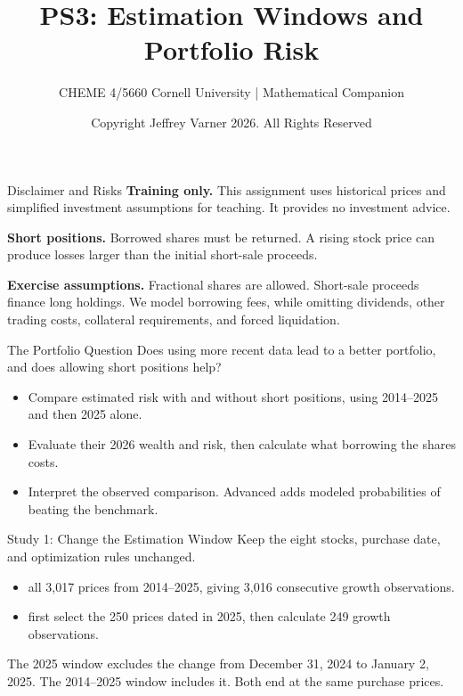 \documentclass[aspectratio=169,11pt]{beamer}
\title{\texorpdfstring{{\vnheavy PS3}}{PS3}: Estimation Windows and Portfolio Risk}
\subtitle{CHEME 4/5660 Cornell University | Mathematical Companion}
\author{Copyright Jeffrey Varner 2026. All Rights Reserved}
\begin{document}
\vntitlepage

\begin{frame}{Disclaimer and Risks}
\textbf{Training only.} This assignment uses historical prices and simplified
investment assumptions for teaching. It provides no investment advice.

\vspace{1em}
\textbf{Short positions.} Borrowed shares must be returned. A rising stock
price can produce losses larger than the initial short-sale proceeds.

\vspace{1em}
\textbf{Exercise assumptions.} Fractional shares are allowed. Short-sale
proceeds finance long holdings. We model borrowing fees, while omitting
dividends, other trading costs, collateral requirements, and forced liquidation.
\end{frame}

\begin{frame}{The Portfolio Question}
Does using more recent data lead to a better portfolio, and does allowing
short positions help?
\vspace{0.7em}
\begin{itemize}\setlength{\itemsep}{0.7em}
\item {} Compare estimated risk with and without
short positions, using 2014--2025 and then 2025 alone.
\item {} Evaluate their 2026 wealth and risk, then
calculate what borrowing the shares costs.
\item {} Interpret the observed comparison.
Advanced adds modeled probabilities of beating the benchmark.
\end{itemize}
\end{frame}

\begin{frame}{Study 1: Change the Estimation Window}
Keep the eight stocks, purchase date, and optimization rules unchanged.
\begin{itemize}\setlength{\itemsep}{0.6em}
\item {} all 3,017 prices from 2014--2025, giving
3,016 consecutive growth observations.
\item {} first select the 250 prices dated in 2025,
then calculate 249 growth observations.
\end{itemize}
\vspace{0.6em}
The 2025 window excludes the change from December 31, 2024 to January 2,
2025. The 2014--2025 window includes it. Both end at the same purchase prices.
\end{frame}
\end{document}
